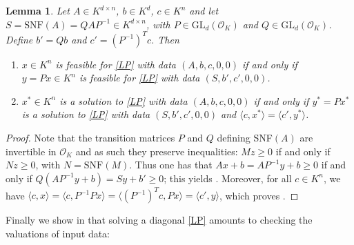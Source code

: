 \documentclass[a4paper,oneside,11pt]{article}
\newtheorem{lemma}[theorem]{Lemma}
\newcommand{\OK}{\mathcal{O}_K}
\newcommand{\GL}{\mathrm{GL}}
\begin{document}
\begin{lemma} \label{solsLP}
  Let $A \in K^{d\times n}$, $b \in K^d$, $c\in K^n$ and let
  $S = \mathrm{SNF}(A) = QAP^{-1} \in K^{d\times n}$, with
  $P \in \GL_d(\OK)$ and $Q\in \GL_d(\OK)$.
  Define $b' = Qb$ and $c' = (P^{-1})^Tc$.
  Then
   \begin{enumerate}
   \item \label{solsLP_item1}
     $x \in K^n$ is feasible for \eqref{LP} with data $(A,b,c,0,0)$ if and only if $y = P x \in K^n$ is
     feasible for \eqref{LP} with data $(S,b',c',0,0)$.
   \item \label{solsLP_item2}
     $x^* \in K^n$ is a solution to \eqref{LP} with data $(A,b,c,0,0)$ if and only if $y^* = P x^*$ is
     a solution to \eqref{LP} with data $(S,b',c',0,0)$ and $\langle c,x^* \rangle = \langle c',y^* \rangle$.
   \end{enumerate}
\end{lemma}
\begin{proof}
  Note that the transition matrices $P$ and $Q$ defining SNF$(A)$ are invertible in $\OK$
  and as such they preserve inequalities: $Mz \geq 0$ if and only if $Nz \geq 0$, with
  $N = \mathrm{SNF}(M)$. Thus one has that $Ax+b = AP^{-1}y +b \geq 0$ if and only if
  $Q(AP^{-1}y + b) = Sy + b' \geq 0$; this yields .
  Moreover, for all $c \in K^n$, we have $\langle c, x\rangle = \langle c, P^{-1}Px \rangle =
  \langle (P^{-1})^T c, Px \rangle = \langle c',y\rangle$, which proves
  .
\end{proof}

Finally we show in  that solving a diagonal \eqref{LP} amounts
to checking the valuations of input data:
\end{document}
